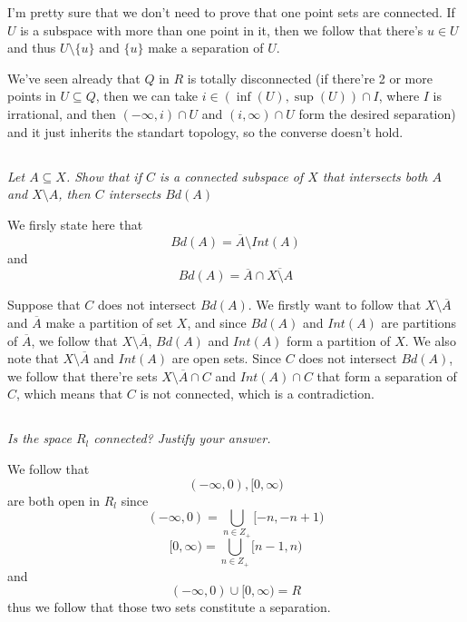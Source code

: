 \documentclass[11pt,oneside,titlepage]{book}
\newcommand{\set}[1]{\{ #1 \}}
\begin{document}
I'm pretty sure that we don't need to prove that one point sets are connected. If $U$ is a
subspace with more than one point in it, then we follow that there's $u \in U$ and thus
$U \setminus \set{u}$ and $\set{u}$ make a separation of $U$.

We've seen already that $Q$ in $R$ is totally disconnected (if there're 2 or more points
in $U \subseteq Q$, then we can take $i \in (\inf(U), \sup(U)) \cap I$, where $I$ is
irrational, and then $(-\infty, i) \cap U$ and $(i, \infty) \cap U$ form the desired separation)
and it just inherits the standart topology, so the converse doesn't hold.

\subsection{}

\textit{Let $A \subseteq X$. Show that if $C$ is a connected subspace of $X$ that intersects
  both $A$ and $X \setminus A$, then $C$ intersects $Bd(A)$}

We firsly state here that
$$Bd(A) = \overline{A} \setminus Int(A)$$
and
$$Bd(A) = \overline{A} \cap \overline{X \setminus A}$$

Suppose that $C$ does not intersect $Bd(A)$. We firstly want to follow that
$X \setminus \overline A$ and $\overline{A}$ make a partition of set $X$, and since
$Bd(A)$ and $Int(A)$ are partitions of $\overline{A}$, we follow that
$X \setminus \overline A$, $Bd(A)$ and $Int(A)$ form a partition of $X$.
We also note that $X \setminus \overline A$ and $Int(A)$ are open sets. 
Since $C$ does not intersect $Bd(A)$, we follow that there're sets
$X \setminus \overline{A} \cap C$ and $Int(A) \cap C$ that form a separation of $C$, which
means that $C$ is not connected, which is a contradiction.

\subsection{}

\textit{Is the space $R_l$ connected? Justify your answer.}

We follow that
$$(-\infty, 0), [0, \infty)$$
are both open in $R_l$ since
$$(-\infty, 0) = \bigcup_{n \in Z_+}{[-n, -n + 1) }$$
$$[0, \infty) = \bigcup_{n \in Z_+}{[n - 1, n) }$$
and
$$(-\infty, 0) \cup [0, \infty) = R$$
thus we follow that those two sets constitute a separation.

\subsection{}
\end{document}
